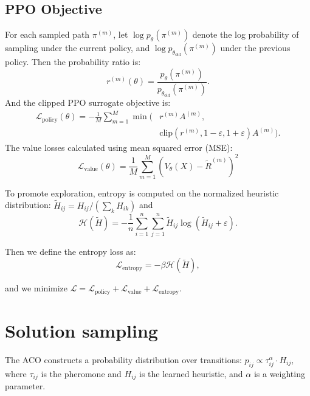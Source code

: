 \documentclass[a4paper,conference]{IEEEtran}
\newcommand{\calH}{\mathcal{H}}
\newcommand{\eps}{\varepsilon}
\begin{document}
\subsection{PPO Objective}
For each sampled path $\pi^{(m)}$, let $\log p_{\theta}(\pi^{(m)})$ denote the log probability of sampling under the current policy, and $\log p_{\theta_{\text{old}}}(\pi^{(m)})$ under the previous policy.
Then the probability ratio is:
\begin{equation}
r^{(m)}(\theta) = \frac{p_{\theta}(\pi^{(m)})}{p_{\theta_{\text{old}}}(\pi^{(m)})}.
\end{equation}
And the clipped PPO surrogate objective is:
\begin{equation}
\begin{aligned}
\mathcal{L}_{\text{policy}}(\theta) = -\frac{1}{M}\sum_{m=1}^M \min\big(&r^{(m)}A^{(m)}, \\
&\text{clip}(r^{(m)},1-\eps,1+\eps)A^{(m)}\big).
\end{aligned}
\end{equation}
The value losses calculated using mean squared error (MSE):
\begin{equation}
\mathcal{L}_{\text{value}}(\theta)
= \frac{1}{M}\sum_{m=1}^{M}\!\left(V_\theta(X) - \tilde R^{(m)}\right)^2
\end{equation}

To promote exploration, entropy is computed on the normalized heuristic distribution: $\tilde{H}_{ij} = H_{ij} / (\sum_k H_{ik})$ and
\begin{equation}
\calH(\tilde{H}) = -\frac{1}n \sum_{i=1}^n\sum_{j=1}^n \tilde{H}_{ij}\log(\tilde{H}_{ij}+\eps).
\end{equation}

Then we define the entropy loss as:
\begin{equation}
\mathcal{L}_{\text{entropy}} = -\beta\calH(\tilde{H}),
\end{equation}

and we minimize $\mathcal{L}=\mathcal{L}_{\text{policy}}+\mathcal{L}_{\text{value}}+\mathcal{L}_{\text{entropy}}$.

\section{Solution sampling}
The ACO constructs a probability distribution over transitions:
$
p_{ij} \propto \tau_{ij}^\alpha \cdot H_{ij},
$
where $\tau_{ij}$ is the pheromone and $H_{ij}$ is the learned heuristic, and $\alpha$ is a weighting parameter.
\end{document}
